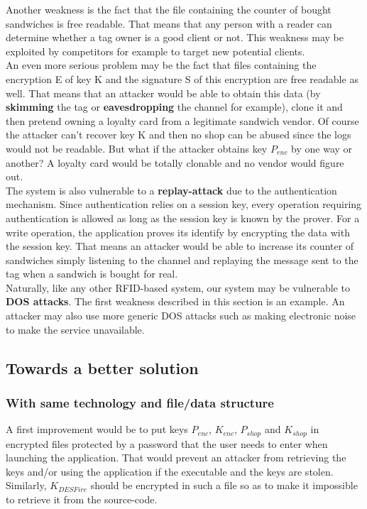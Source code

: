 \documentclass[a4paper,11pt,oneside]{article}
\begin{document}
Another weakness is the fact that the file containing the counter of bought sandwiches is free readable. That means that any person with a reader can determine whether a tag owner is a good client or not. This weakness may be exploited by competitors for example to target new potential clients. \\ 

An even more serious problem may be the fact that files containing the encryption E of key K and the signature S of this encryption are free readable as well. That means that an attacker would be able to obtain this data (by \textbf{skimming} the tag or \textbf{eavesdropping} the channel for example), clone it and then pretend owning a loyalty card from a legitimate sandwich vendor. Of course the attacker can't recover key K and then no shop can be abused since the logs would not be readable. But what if the attacker obtains key $P_{enc}$ by one way or another? A loyalty card would be totally clonable and no vendor would figure out. \\

The system is also vulnerable to a \textbf{replay-attack} due to the authentication mechanism. Since authentication relies on a session key, every operation requiring authentication is allowed as long as the session key is known by the prover. For a write operation, the application proves its identify by encrypting the data with the session key. That means an attacker would be able to increase its counter of sandwiches simply listening to the channel and replaying the message sent to the tag when a sandwich is bought for real. \\

Naturally, like any other RFID-based system, our system may be vulnerable to \textbf{DOS attacks}. The first weakness described in this section is an example. An attacker may also use more generic DOS attacks such as making electronic noise to make the service unavailable. \\

\newpage
\subsection{Towards a better solution}

\subsubsection{With same technology and file/data structure}

A first improvement would be to put keys $P_{enc}$, $K_{enc}$, $P_{shop}$ and $K_{shop}$ in encrypted files protected by a password that the user needs to enter when launching the application. That would prevent an attacker from retrieving the keys and/or using the application if the executable and the keys are stolen. Similarly, $K_{DESFire}$ should be encrypted in such a file so as to make it impossible to retrieve it from the source-code. \\
\end{document}
